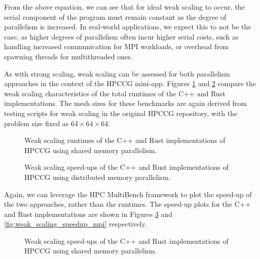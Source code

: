 From the above equation, we can see that for ideal weak scaling to occur, the serial component of the program must remain constant as the degree of parallelism is increased. In real-world applications, we expect this to not be the case, as higher degrees of parallelism often incur higher serial costs, such as handling increased communication for MPI workloads, or overhead from spawning threads for multithreaded ones.

As with strong scaling, weak scaling can be assessed for both parallelism approaches in the context of the HPCCG \acrshort{mini-app}. Figures \ref{fig:weak_scaling_threaded} and \ref{fig:weak_scaling_mpi} compare the weak scaling characteristics of the total runtimes of the C++ and Rust implementations. The mesh sizes for these benchmarks are again derived from testing scripts for weak scaling in the original HPCCG repository, with the problem size fixed as $64 \times 64 \times 64$.

\begin{figure}[H]
    \centering
    
    \vspace*{-0.5cm}
    \caption{Weak scaling runtimes of the C++ and Rust implementations of HPCCG using shared memory parallelism.}
    \label{fig:weak_scaling_threaded}
\end{figure}

\begin{figure}[H]
    \centering
    
    \vspace*{-0.5cm}
    \caption{Weak scaling speed-ups of the C++ and Rust implementations of HPCCG using distributed memory parallelism.}
    \label{fig:weak_scaling_mpi}
\end{figure}

Again, we can leverage the HPC MultiBench framework to plot the speed-up of the two approaches, rather than the runtimes. The speed-up plots for the C++ and Rust implementations are shown in Figures \ref{fig:weak_scaling_speedup_threaded} and \ref{fig:weak_scaling_speedup_mpi} respectively.

\begin{figure}[H]
    \centering
    
    \vspace*{-0.5cm}
    \caption{Weak scaling speed-ups of the C++ and Rust implementations of HPCCG using shared memory parallelism.}
    \label{fig:weak_scaling_speedup_threaded}
\end{figure}

